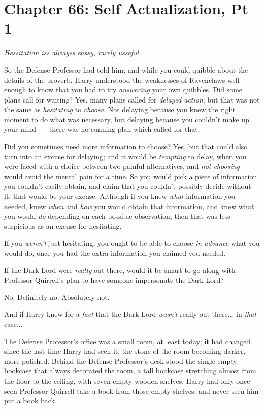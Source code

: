 \chapter{Chapter 66: Self Actualization, Pt 1}
\emph{Hessitation iss alwayss eassy, rarely usseful.}

So the Defense Professor had told him; and while you could quibble about the details of the proverb, Harry understood the weaknesses of Ravenclaws well enough to know that you had to try \emph{answering} your own quibbles. Did some plans call for waiting? Yes, many plans called for \emph{delayed action}; but that was not the same as \emph{hesitating} to \emph{choose}. Not delaying because you knew the right moment to do what was necessary, but delaying because you couldn't make up your mind~--- there was no cunning plan which called for that.

Did you sometimes need more information to choose? Yes, but that could also turn into an excuse for delaying; and it would be \emph{tempting} to delay, when you were faced with a choice between two painful alternatives, and \emph{not choosing} would avoid the mental pain for a time. So you would pick a piece of information you couldn't easily obtain, and claim that you couldn't possibly decide without it; that would be your excuse. Although if you knew \emph{what} information you needed, knew \emph{when} and \emph{how} you would obtain that information, and knew what you would \emph{do} depending on each possible observation, then that was less suspicious as an excuse for hesitating.

If you \emph{weren't} just hesitating, you ought to be able to choose \emph{in advance} what you would do, once you had the extra information you claimed you needed.

If the Dark Lord were \emph{really} out there, would it be smart to go along with Professor Quirrell's plan to have someone impersonate the Dark Lord?

No. Definitely no. Absolutely not.

And if Harry knew for a \emph{fact} that the Dark Lord \emph{wasn't} really out there... in \emph{that} case...

The Defense Professor's office was a small room, at least today; it had changed since the last time Harry had seen it, the stone of the room becoming darker, more polished. Behind the Defense Professor's desk stood the single empty bookcase that always decorated the room, a tall bookcase stretching almost from the floor to the ceiling, with seven empty wooden shelves. Harry had only once seen Professor Quirrell take a book from those empty shelves, and never seen him put a book back.

